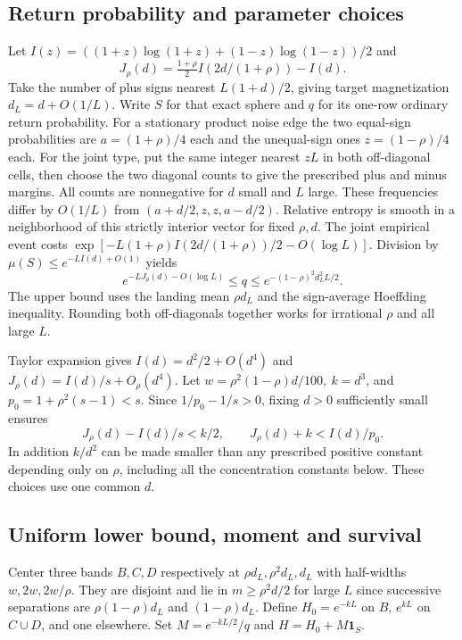 \documentclass[11pt]{article}
\newcommand{\one}{\mathbf 1}
\begin{document}
\subsection{Return probability and parameter choices}
Let \(I(z)=((1+z)\log(1+z)+(1-z)\log(1-z))/2\) and
\[
 J_\rho(d)=\tfrac{1+\rho}{2} I(2d/(1+\rho))-I(d).
\]
Take the number of plus signs nearest \(L(1+d)/2\), giving target magnetization \(d_L=d+O(1/L)\). Write \(S\) for that exact sphere and \(q\) for its one-row ordinary return probability. For a stationary product noise edge the two equal-sign probabilities are \(a=(1+\rho)/4\) each and the unequal-sign ones \(z=(1-\rho)/4\) each. For the joint type, put the same integer nearest \(zL\) in both off-diagonal cells, then choose the two diagonal counts to give the prescribed plus and minus margins. All counts are nonnegative for \(d\) small and \(L\) large. These frequencies differ by \(O(1/L)\) from \((a+d/2,z,z,a-d/2)\). Relative entropy is smooth in a neighborhood of this strictly interior vector for fixed \(\rho,d\). The joint empirical event costs \(\exp[-L(1+\rho)I(2d/(1+\rho))/2-O(\log L)]\). Division by \(\mu(S)\le e^{-LI(d)+O(1)}\) yields
\[
 e^{-LJ_\rho(d)-O(\log L)}\le q\le e^{-(1-\rho)^2d_L^2L/2}.
\]
The upper bound uses the landing mean \(\rho d_L\) and the sign-average Hoeffding inequality. Rounding both off-diagonals together works for irrational \(\rho\) and all large \(L\).

Taylor expansion gives \(I(d)=d^2/2+O(d^4)\) and \(J_\rho(d)=I(d)/s+O_\rho(d^4)\). Let \(w=\rho^2(1-\rho)d/100,\ k=d^3\), and \(p_0=1+\rho^2(s-1)<s\). Since \(1/p_0-1/s>0\), fixing \(d>0\) sufficiently small ensures
\[
 J_\rho(d)-I(d)/s<k/2,\qquad J_\rho(d)+k<I(d)/p_0.
\]
In addition \(k/d^2\) can be made smaller than any prescribed positive constant depending only on \(\rho\), including all the concentration constants below. These choices use one common \(d\).

\subsection{Uniform lower bound, moment and survival}

Center three bands \(B,C,D\) respectively at \(\rho d_L,\rho^2d_L,d_L\) with half-widths \(w,2w,2w/\rho\). They are disjoint and lie in \(m\ge \rho^2 d/2\) for large \(L\) since successive separations are \(\rho(1-\rho)d_L\) and \((1-\rho)d_L\). Define \(H_0=e^{-kL}\) on \(B\), \(e^{kL}\) on \(C\cup D\), and one elsewhere. Set \(M=e^{-kL/2}/q\) and \(H=H_0+M\one_S\).
\end{document}
